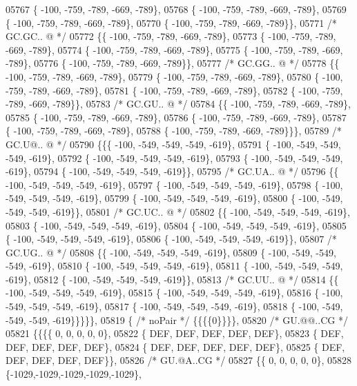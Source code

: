 \begin{DoxyCode}
05767 \{ -100, -759, -789, -669, -789\},
05768 \{ -100, -759, -789, -669, -789\},
05769 \{ -100, -759, -789, -669, -789\},
05770 \{ -100, -759, -789, -669, -789\}\},
05771 \textcolor{comment}{/* GC.GC.. @ */}
05772 \{\{ -100, -759, -789, -669, -789\},
05773 \{ -100, -759, -789, -669, -789\},
05774 \{ -100, -759, -789, -669, -789\},
05775 \{ -100, -759, -789, -669, -789\},
05776 \{ -100, -759, -789, -669, -789\}\},
05777 \textcolor{comment}{/* GC.GG.. @ */}
05778 \{\{ -100, -759, -789, -669, -789\},
05779 \{ -100, -759, -789, -669, -789\},
05780 \{ -100, -759, -789, -669, -789\},
05781 \{ -100, -759, -789, -669, -789\},
05782 \{ -100, -759, -789, -669, -789\}\},
05783 \textcolor{comment}{/* GC.GU.. @ */}
05784 \{\{ -100, -759, -789, -669, -789\},
05785 \{ -100, -759, -789, -669, -789\},
05786 \{ -100, -759, -789, -669, -789\},
05787 \{ -100, -759, -789, -669, -789\},
05788 \{ -100, -759, -789, -669, -789\}\}\},
05789 \textcolor{comment}{/* GC.U@.. @ */}
05790 \{\{\{ -100, -549, -549, -549, -619\},
05791 \{ -100, -549, -549, -549, -619\},
05792 \{ -100, -549, -549, -549, -619\},
05793 \{ -100, -549, -549, -549, -619\},
05794 \{ -100, -549, -549, -549, -619\}\},
05795 \textcolor{comment}{/* GC.UA.. @ */}
05796 \{\{ -100, -549, -549, -549, -619\},
05797 \{ -100, -549, -549, -549, -619\},
05798 \{ -100, -549, -549, -549, -619\},
05799 \{ -100, -549, -549, -549, -619\},
05800 \{ -100, -549, -549, -549, -619\}\},
05801 \textcolor{comment}{/* GC.UC.. @ */}
05802 \{\{ -100, -549, -549, -549, -619\},
05803 \{ -100, -549, -549, -549, -619\},
05804 \{ -100, -549, -549, -549, -619\},
05805 \{ -100, -549, -549, -549, -619\},
05806 \{ -100, -549, -549, -549, -619\}\},
05807 \textcolor{comment}{/* GC.UG.. @ */}
05808 \{\{ -100, -549, -549, -549, -619\},
05809 \{ -100, -549, -549, -549, -619\},
05810 \{ -100, -549, -549, -549, -619\},
05811 \{ -100, -549, -549, -549, -619\},
05812 \{ -100, -549, -549, -549, -619\}\},
05813 \textcolor{comment}{/* GC.UU.. @ */}
05814 \{\{ -100, -549, -549, -549, -619\},
05815 \{ -100, -549, -549, -549, -619\},
05816 \{ -100, -549, -549, -549, -619\},
05817 \{ -100, -549, -549, -549, -619\},
05818 \{ -100, -549, -549, -549, -619\}\}\}\}\},
05819 \{ \textcolor{comment}{/* noPair */} \{\{\{\{0\}\}\}\},
05820 \textcolor{comment}{/* GU.@@..CG */}
05821 \{\{\{\{    0,    0,    0,    0,    0\},
05822 \{  DEF,  DEF,  DEF,  DEF,  DEF\},
05823 \{  DEF,  DEF,  DEF,  DEF,  DEF\},
05824 \{  DEF,  DEF,  DEF,  DEF,  DEF\},
05825 \{  DEF,  DEF,  DEF,  DEF,  DEF\}\},
05826 \textcolor{comment}{/* GU.@A..CG */}
05827 \{\{    0,    0,    0,    0,    0\},
05828 \{-1029,-1029,-1029,-1029,-1029\},

\end{DoxyCode}
